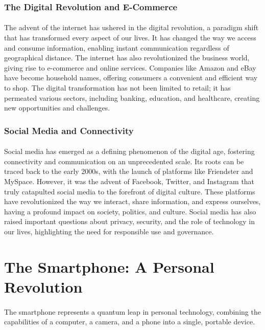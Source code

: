 \documentclass[a4paper,12pt]{book}
\begin{document}
\subsubsection*{The Digital Revolution and E-Commerce}
\paragraph{}
The advent of the internet has ushered in the digital revolution, a paradigm shift that has transformed every aspect of our lives. It has changed the way we access and consume information, enabling instant communication regardless of geographical distance. The internet has also revolutionized the business world, giving rise to e-commerce and online services. Companies like Amazon and eBay have become household names, offering consumers a convenient and efficient way to shop. The digital transformation has not been limited to retail; it has permeated various sectors, including banking, education, and healthcare, creating new opportunities and challenges.

\subsubsection*{Social Media and Connectivity}
\paragraph{}
Social media has emerged as a defining phenomenon of the digital age, fostering connectivity and communication on an unprecedented scale. Its roots can be traced back to the early 2000s, with the launch of platforms like Friendster and MySpace. However, it was the advent of Facebook, Twitter, and Instagram that truly catapulted social media to the forefront of digital culture. These platforms have revolutionized the way we interact, share information, and express ourselves, having a profound impact on society, politics, and culture. Social media has also raised important questions about privacy, security, and the role of technology in our lives, highlighting the need for responsible use and governance.

\section*{The Smartphone: A Personal Revolution}
\paragraph{}
The smartphone represents a quantum leap in personal technology, combining the capabilities of a computer, a camera, and a phone into a single, portable device.
\end{document}
